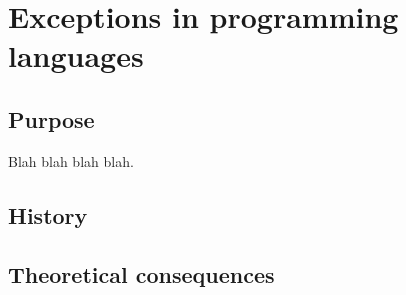 \chapter{Exceptions in programming languages}

\section{Purpose}

Blah blah blah blah. \cite{swierstra:thesis}

\section{History}

\section{Theoretical consequences}
